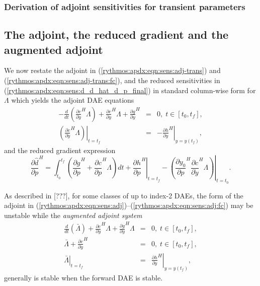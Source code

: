 \documentclass[pdf,ps2pdf,11pt]{SANDreport}
\begin{document}
\subsubsection{Derivation of adjoint sensitivities for transient parameters}

\subsection{The adjoint, the reduced gradient and the augmented adjoint}

We now restate the adjoint in (\ref{rythmos:apdx:eqn:sens:adj-trans}) and
(\ref{rythmos:apdx:eqn:sens:adj-trans:fc}), and the reduced sensitivities in
(\ref{rythmos:apdx:eqn:sens:d_d_hat_d_p_final}) in standard column-wise form
for $\Lambda$ which yields the adjoint DAE equations
%
\begin{eqnarray}
- \frac{d}{dt}\left( \frac{\partial c}{\partial \dot{y}}^H \Lambda \right)
+  \frac{\partial c}{\partial y}^H \Lambda + \frac{\partial g}{\partial y}^H
& = & 0, \; t \in \left[ t_0, t_f \right],
\label{rythmos:apdx:eqn:sens:adj} \\
\left.\left( \frac{\partial c}{\partial \dot{y}}^H \Lambda \right)\right|_{t=t_f}
& = & - \left. \frac{\partial h}{\partial y}^H \right|_{y=y(t_f)},
\label{rythmos:apdx:eqn:sens:adj:fc}
\end{eqnarray}
%
and the reduced gradient expression
%
\begin{equation}
\frac{\partial \hat{d}}{\partial p}^H =
\int_{t_0}^{t_f} \left(
    \frac{\partial g}{\partial p}^H
    + \frac{\partial c}{\partial p}^H \Lambda
  \right) dt
  + \left. \frac{\partial h}{\partial p}^H \right|_{t=t_f}
  - \left. \left( \frac{\partial y_0}{\partial p}^H \frac{\partial c}{\partial \dot{y}}^H \Lambda \right) \right|_{t=t_0}.
\label{rythmos:apdx:eqn:sens:d_d_hat_d_p_final-2}
\end{equation}
%

As described in [???], for some classes of up to index-2 DAEs, the form of the
adjoint in
(\ref{rythmos:apdx:eqn:sens:adj})--(\ref{rythmos:apdx:eqn:sens:adj:fc}) may be
unstable while the {}\textit{augmented adjoint system}
%
\begin{eqnarray}
\frac{d}{dt}\left( \bar{\Lambda} \right)
+  \frac{\partial c}{\partial y}^H \Lambda + \frac{\partial g}{\partial y}^H \Lambda
& = & 0, \; t \in \left[ t_0, t_f \right],
\label{rythmos:apdx:eqn:sens:aug-adj-de} \\
\bar{\Lambda} + \frac{\partial c}{\partial \dot{y}}^H
& = & 0, \; t \in \left[ t_0, t_f \right],
\label{rythmos:apdx:eqn:sens:aug-adj-ae} \\
\left. \bar{\Lambda} \right|_{t=t_f}
& = & \left. \frac{\partial h}{\partial y}^H \right|_{y=y(t_f)},
\label{rythmos:apdx:eqn:sens:aug-adj:fc}
\end{eqnarray}
%
generally is stable when the forward DAE is stable.
\end{document}
